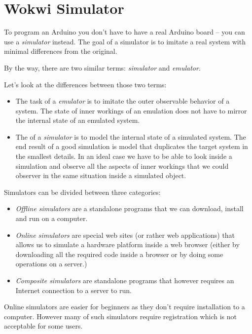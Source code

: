 \documentclass[../sparc.tex]{subfiles}
\begin{document}
\section{Wokwi Simulator}

To program an Arduino you don't have to have a real Arduino board -- you can use
a \emph{simulator} instead.  The goal of a simulator is to imitate a real system
with minimal differences from the original.

By the way, there are two similar terms: \emph{simulator} and \emph{emulator}.

Let's look at the differences\cite{so:simulator-vs-emulator} between those two
terms:

\begin{itemize}
\item The task of a \emph{emulator} is to imitate the outer observable behavior
  of a system.  The state of inner workings of an emulation does not have to
  mirror the internal state of an emulated system.
\item The of a \emph{simulator} is to model the internal state of a simulated
  system.  The end result of a good simulation is model that duplicates the
  target system in the smallest details.  In an ideal case we have to be able to
  look inside a simulation and observe all the aspects of inner workings that we
  could observer in the same situation inside a simulated object.
\end{itemize}

Simulators can be divided between three categories:
\begin{itemize}
\item \emph{Offline simulators} are a standalone programs that we can download,
  install and run on a computer.
\item \emph{Online simulators} are special web sites (or rather web
  applications) that allows us to simulate a hardware platform inside a web
  browser (either by downloading all the required code inside a browser or by
  doing some operations on a server.)
\item \emph{Composite simulators} are standalone programs that however requires
  an Internet connection to a server to run.
\end{itemize}

Online simulators are easier for beginners as they don't require installation to
a computer.  However many of such simulators require registration which is not
acceptable for some users.
\end{document}
